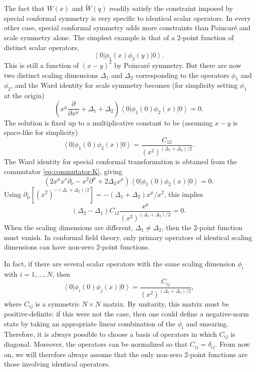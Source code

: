 \documentclass[a4paper,12pt]{article}
\newcommand{\ket}[1]{\left| #1 \right\rangle}
\newcommand{\bra}[1]{\left\langle #1 \right|}
\numberwithin{equation}{section}
\begin{document}
The fact that $W(x)$ and $\widetilde{W}(q)$ readily satisfy the constraint imposed by special conformal symmetry is very specific to identical scalar operators. In every other case, special conformal symmetry adds more constraints than Poincaré and scale symmetry alone.
The simplest example is that of a 2-point function of distinct scalar operators,
\begin{equation}
	\bra{0} \phi_1(x) \phi_2(y) \ket{0}.
\end{equation}
This is still a function of $(x-y)^2$ by Poincaré symmetry. But there are now two distinct scaling dimensions $\Delta_1$ and $\Delta_2$ corresponding to the operators $\phi_1$ and $\phi_2$, and the Ward identity for scale symmetry becomes (for simplicity setting $\phi_1$ at the origin)
\begin{equation}
	\left( x^\mu \frac{\partial}{\partial x^\mu}
	+ \Delta_1 + \Delta_2 \right)
	\bra{0} \phi_1(0) \phi_2(x) \ket{0} = 0.
\end{equation}
The solution is fixed up to a multiplicative constant to be
(assuming $x - y$ is space-like for simplicity)
\begin{equation}
	\bra{0} \phi_1(0) \phi_2(x) \ket{0}
	= \frac{C_{12}}{(x^2)^{(\Delta_1 + \Delta_2)/2}}.
\end{equation}
The Ward identity for special conformal transformation is obtained from the commutator \eqref{eq:commutator:K}, giving
\begin{equation}
	\left( 2 x^\mu x^\nu \partial_\nu - x^2 \partial^\mu 
	+ 2 \Delta_2 x^\mu \right)
	\bra{0} \phi_1(0) \phi_2(x) \ket{0}
	= 0.
\end{equation}
Using $\partial_\mu \left[ (x^2)^{-(\Delta_1 + \Delta_2)/2} \right] = -(\Delta_1 + \Delta_2) x^\mu / x^2$, this implies
\begin{equation}
	\left( \Delta_2 - \Delta_1 \right) C_{12} 
	\frac{x^\mu}{(x^2)^{(\Delta_1 + \Delta_2)/2}} = 0.
\end{equation}
When the scaling dimensions are different, $\Delta_1 \neq \Delta_2$, then the 2-point function must vanish. In conformal field theory, only primary operators of identical scaling dimensions can have non-zero 2-point functions.

In fact, if there are several scalar operators with the same scaling dimension $\phi_i$ with $i = 1, \ldots, N$, then 
\begin{equation}
	\bra{0} \phi_i(0) \phi_j(x) \ket{0}
	= \frac{C_{ij}}{(x^2)^{(\Delta_1 + \Delta_2)/2}},
\end{equation}
where $C_{ij}$ is a symmetric $N \times N$ matrix. By unitarity, this matrix must be positive-definite: if this were not the case, then one could define a negative-norm state by taking an appropriate linear combination of the $\phi_i$ and smearing. Therefore, it is always possible to choose a basis of operators in which $C_{ij}$ is diagonal. Moreover, the operators can be normalized so that $C_{ij} = \delta_{ij}$. From now on, we will therefore always assume that the only non-zero 2-point functions are those involving identical operators.
\end{document}
